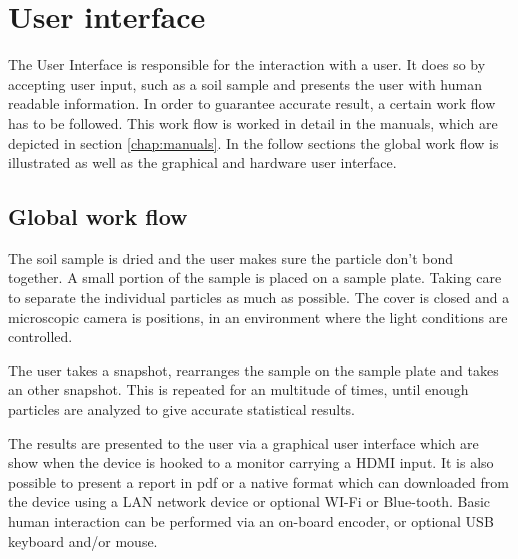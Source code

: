 \documentclass[11pt,fleqn,,a4paper,twoside,openright]{book}
\begin{document}
\chapter{User interface}\label{chap:UserInterface}
The User Interface is responsible for the interaction with a user. It does so by accepting user input, such as a soil sample and presents the user with human readable information. In order to guarantee accurate result, a certain work flow has to be followed. This work flow is worked in detail in the manuals, which are depicted in section \ref{chap:manuals}. In the follow sections the global work flow is illustrated as well as the graphical and hardware user interface.

\section{Global work flow}
The soil sample is dried and the user makes sure the particle don't bond together. A small portion of the sample is placed on a sample plate. Taking care to separate the individual particles as much as possible. The cover is closed and a microscopic camera is positions, in an environment where the light conditions are controlled.

The user takes a snapshot, rearranges the sample on the sample plate and takes an other snapshot. This is repeated for an multitude of times, until enough particles are analyzed to give accurate statistical results.

The results are presented to the user via a graphical user interface which are show when the device is hooked to a monitor carrying a HDMI input. It is also possible to present a report in pdf or a native format which can downloaded from the device using a LAN network device or optional WI-Fi or Blue-tooth. Basic human interaction can be performed via an on-board encoder, or optional USB keyboard and/or mouse.

\newpage
\end{document}
